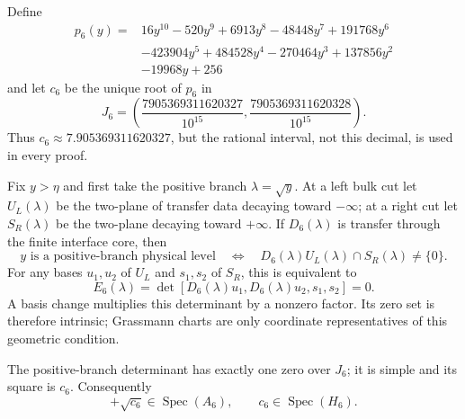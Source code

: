 Define
\[
\begin{aligned}
p_6(y)={}&16y^{10}-520y^9+6913y^8-48448y^7+191768y^6\\
&-423904y^5+484528y^4-270464y^3+137856y^2\\
&-19968y+256
\end{aligned}
\]
and let \(c_6\) be the unique root of \(p_6\) in
\begin{equation}\label{eq:c6-interval}
J_6=
\left(
\frac{7905369311620327}{10^{15}},
\frac{7905369311620328}{10^{15}}
\right).
\end{equation}
Thus \(c_6\approx7.905369311620327\), but the rational interval, not this
decimal, is used in every proof.

Fix \(y>\eta\) and first take the positive branch
\(\lambda=\sqrt y\).  At a left bulk cut let \(U_L(\lambda)\) be the
two-plane of transfer data decaying toward \(-\infty\); at a right cut let
\(S_R(\lambda)\) be the two-plane decaying toward \(+\infty\).  If
\(D_6(\lambda)\) is transfer through the finite interface core, then
\[
y\text{ is a positive-branch physical level}
\quad\Longleftrightarrow\quad
D_6(\lambda)U_L(\lambda)\cap S_R(\lambda)\neq\{0\}.
\]
For any bases \(u_1,u_2\) of \(U_L\) and \(s_1,s_2\) of \(S_R\), this is
equivalent to
\begin{equation}\label{eq:g6-evans}
E_6(\lambda)
=\det[D_6(\lambda)u_1,D_6(\lambda)u_2,s_1,s_2]=0.
\end{equation}
A basis change multiplies this determinant by a nonzero factor.  Its zero
set is therefore intrinsic; Grassmann charts are only coordinate
representatives of this geometric condition.

\begin{lemma}\label{lem:c6-realization}
The positive-branch determinant has exactly one zero over \(J_6\); it is
simple and its square is \(c_6\).  Consequently
\[
+\sqrt{c_6}\in\operatorname{Spec}(A_6),
\qquad
c_6\in\operatorname{Spec}(H_6).
\]
\end{lemma}

